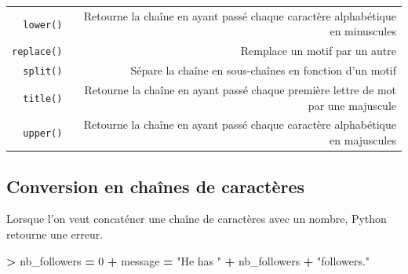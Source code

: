 \documentclass[12pt,]{book}
\newenvironment{Shaded}{\begin{snugshade}}{\end{snugshade}}
\newcommand{\DecValTok}[1]{\textcolor[rgb]{0.00,0.00,0.81}{#1}}
\newcommand{\StringTok}[1]{\textcolor[rgb]{0.31,0.60,0.02}{#1}}
\newcommand{\OperatorTok}[1]{\textcolor[rgb]{0.81,0.36,0.00}{\textbf{#1}}}
\newcommand{\NormalTok}[1]{#1}
\numberwithin{equation}{section}
\numberwithin{countremarque}{section}
\begin{document}
\begin{longtable}[]{@{}rr@{}}
\begin{minipage}[t]{0.15\columnwidth}
\texttt{lower()}\strut
\end{minipage} & \begin{minipage}[t]{0.79\columnwidth}\raggedleft\strut
Retourne la chaîne en ayant passé chaque caractère alphabétique en
minuscules\strut
\end{minipage}\tabularnewline
\begin{minipage}[t]{0.15\columnwidth}\raggedleft\strut
\texttt{replace()}\strut
\end{minipage} & \begin{minipage}[t]{0.79\columnwidth}\raggedleft\strut
Remplace un motif par un autre\strut
\end{minipage}\tabularnewline
\begin{minipage}[t]{0.15\columnwidth}\raggedleft\strut
\texttt{split()}\strut
\end{minipage} & \begin{minipage}[t]{0.79\columnwidth}\raggedleft\strut
Sépare la chaîne en sous-chaînes en fonction d'un motif\strut
\end{minipage}\tabularnewline
\begin{minipage}[t]{0.15\columnwidth}\raggedleft\strut
\texttt{title()}\strut
\end{minipage} & \begin{minipage}[t]{0.79\columnwidth}\raggedleft\strut
Retourne la chaîne en ayant passé chaque première lettre de mot par une
majuscule\strut
\end{minipage}\tabularnewline
\begin{minipage}[t]{0.15\columnwidth}\raggedleft\strut
\texttt{upper()}\strut
\end{minipage} & \begin{minipage}[t]{0.79\columnwidth}\raggedleft\strut
Retourne la chaîne en ayant passé chaque caractère alphabétique en
majuscules\strut
\end{minipage}\tabularnewline
\bottomrule
\end{longtable}

\subsection{Conversion en chaînes de
caractères}\label{conversion-en-chaines-de-caracteres}

Lorsque l'on veut concaténer une chaîne de caractères avec un nombre,
Python retourne une erreur.

\begin{Shaded}
\begin{Highlighting}[]
\OperatorTok{>}\NormalTok{ nb_followers }\OperatorTok{=} \DecValTok{0}
\OperatorTok{+}\NormalTok{ message }\OperatorTok{=} \StringTok{"He has "} \OperatorTok{+}\NormalTok{ nb_followers }\OperatorTok{+} \StringTok{"followers."}
\end{Highlighting}
\end{Shaded}
\end{document}
